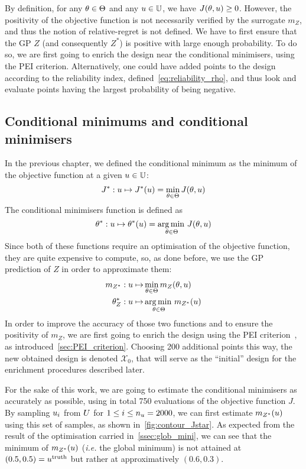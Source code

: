 \documentclass[../../Main_ManuscritThese.tex]{subfiles}
\begin{document}
By definition, for any $\theta\in \Theta$ and any $u \in \mathbb{U}$, we
have $J(\theta, u) \geq 0$.  However, the positivity of the objective
function is not necessarily verified by the surrogate $m_Z$, and thus
the notion of relative-regret is not defined. We have to first ensure
that the GP $Z$ (and consequently $Z^*$) is positive with large enough
probability.  To do so, we are first going to enrich the design near
the conditional minimisers, using the PEI criterion.  Alternatively,
one could have added points to the design according to the reliability
index, defined~\cref{eq:reliability_rho}, and thus look and evaluate points
having the largest probability of being negative.


\subsection{Conditional minimums and conditional minimisers}
\label{ssec:croco_cond_minimum_minimisers}

In the previous chapter, we defined the conditional minimum as the
minimum of the objective function at a given $u\in \mathbb{U}$:
\begin{equation}
  J^* : u \mapsto J^*(u) = \min_{\theta\in\Theta} J(\theta, u)
\end{equation}
The conditional minimisers function is defined as
\begin{equation}
  \theta^*:u  \mapsto \theta^*(u) = \operatorname*{arg\,min \,}_{\theta \in \Theta} J(\theta, u)
\end{equation}
Since both of these functions require an optimisation of the objective
function, they are quite expensive to compute, so, as done before, we
use the GP prediction of $Z$ in order to approximate them:
\begin{align}
  m_{Z^*}: u\mapsto &\min_{\theta \in \Theta} m_Z(\theta, u) \\
  \theta^*_{Z}: u  \mapsto &\operatorname*{arg\,min \,}_{\theta \in \Theta} m_{Z^*}(u)
\end{align}
In order to improve the accuracy of those two functions and to ensure
the positivity of $m_Z$, we are first going to enrich the design using
the PEI criterion~\citep{ginsbourger_bayesian_2014}, as
introduced~\cref{sec:PEI_criterion}.  Choosing \num{200}
additional points this way, the new obtained design is denoted
$\mathcal{X}_0$, that will serve as the ``initial'' design for the
enrichment procedures described later.

For the sake of this work, we are going to estimate the conditional
minimisers as accurately as possible, using in total \num{750}
evaluations of the objective function $J$. By sampling $u_i$ from
$U$ for $1\leq i \leq n_{u}=\num{2000}$, we can first estimate
$m_{Z^*}(u)$ using this set of samples, as shown
in~\cref{fig:contour_Jstar}. As expected from the result of the
optimisation carried in~\cref{ssec:glob_mini}, we can see that the
minimum of $m_{Z^*}(u)$ (\emph{i.e.} the global minimum) is not
attained at $(0.5, 0.5)=u^{\mathrm{truth}}$ but rather at
approximatively $(\num{0.6},\num{0.3})$.
\end{document}
